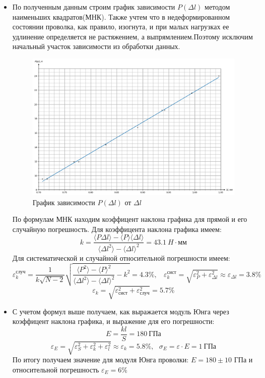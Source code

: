 \documentclass[a4paper,12pt]{article} %
\begin{document}
\begin{itemize}
 \item По полученным данным строим график зависимости $P(\Delta l)$ методом наименьших квадратов(МНК). Также
учтем что в недеформированном состоянии проволка, как правило, изогнута, и при малых нагрузках ее удлинение
определяется не растяжением, а выпрямлением.Поэтому исключим начальный участок зависимости из обработки данных.

\begin{figure}[!ht]
    \begin{center}
        \includegraphics[width=1\textwidth]{pictures/graphic1.png}
        \caption{График зависимости $P(\Delta l)$ от $\Delta l$}
        \label{graphic1}
    \end{center}
\end{figure}

По формулам МНК находим коэффицент наклона графика для прямой и его случайную погрешность.
Для коэффицента наклона графика имеем:
$$k=\dfrac{\langle P \Delta l \rangle-\langle P \rangle \langle \Delta l \rangle}
{\langle \Delta l^2 \rangle - \langle \Delta l \rangle^2}
=43.1 \ H \cdot \text{мм}$$
Для систематической и случайной относительной погрешности имеем:
$$\varepsilon_k^\text{случ}=\frac{1}{k\sqrt{N-2}}\sqrt{\frac{\langle P^2 \rangle - \langle P \rangle^2}
{\langle \Delta l^2 \rangle - \langle \Delta l \rangle^2} - k^2 }=4.3 \%, \ \ \ \ 
\varepsilon_k^\text{сист}=\sqrt{\varepsilon^2_{P}+\varepsilon^2_{\Delta l}}\approx \varepsilon_{\Delta l} = 3.8 \% $$
$$\varepsilon_k=\sqrt{\varepsilon_\text{сист}^2+\varepsilon_\text{случ}^2}=5.7\% $$
    \item С учетом формул выше получаем, как выражается модуль Юнга через коэффицент наклона графика,
и выражение для его погрешности:
$$ E = \frac{k l}{S} = 180 \ \text{ГПа}$$
$$\varepsilon_{E}=\sqrt{\varepsilon^2_{S}+\varepsilon^2_{k}+\varepsilon^2_{l}} \approx \varepsilon_{k} = 5.8 \%, \ \ \ \sigma_{E}= \varepsilon \cdot E = 1 \ \text{ГПа}$$
По итогу получаем значение для модуля Юнга проволки: $E = 180 \pm 10$ ГПа и относительной погрешность $\varepsilon_{E}= 6\%$
\end{itemize}
\end{document}
